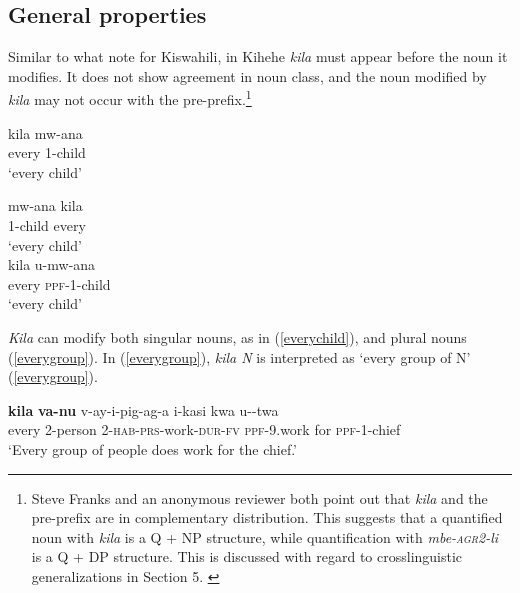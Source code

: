\documentclass[letterpaper, 12pt]{article}
\begin{document}
\subsection{General properties}

Similar to what  note for Kiswahili, in Kihehe \textit{kila} must appear before the noun it modifies. It does not show agreement in noun class, and the noun modified by \textit{kila} may not occur with the pre-prefix.\footnote{Steve Franks and an anonymous reviewer both point out that \textit{kila} and the pre-prefix are in complementary distribution.  This suggests that a quantified noun with \textit{kila} is a Q + NP structure, while quantification with \textit{mbe-\textsc{agr2}-li} is a Q + DP structure. This is discussed with regard to crosslinguistic generalizations in Section 5. \label{footnote}} 

\begin{exe} 
\ex \begin{xlist}
\ex \gll kila mw-ana \\ 
every 1-child \\
`every child' \\ \label{everychild} 

\ex \gll * mw-ana kila \\
{} 1-child every \\
`every child' \\


\ex \gll * kila u-mw-ana \label{everyppfn}\\
{} every \textsc{ppf}-1-child \\
`every child'


\end{xlist}
\end{exe} 

\textit{Kila} can modify both singular nouns, as in (\ref{everychild}), and plural nouns (\ref{everygroup}). In (\ref{everygroup}), \textit{kila N} is interpreted as `every group of N' (\ref{everygroup}).   


\begin{exe}

\ex \gll \textbf{kila} \textbf{va-nu} v-ay-i-pig-ag-a i-kasi kwa u--twa \\
every 2-person 2-\textsc{hab}-\textsc{prs}-work-\textsc{dur}-\textsc{fv} \textsc{ppf}-9.work for \textsc{ppf}-1-chief \\
`Every group of people does work for the chief.' \label{everygroup}

\end{exe}
\end{document}
